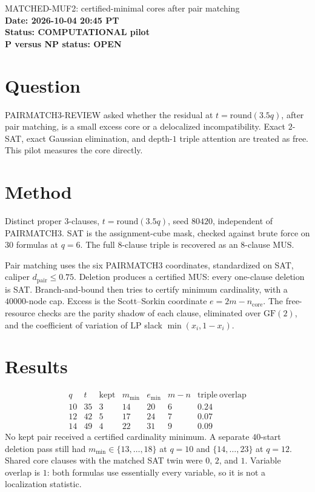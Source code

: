 \documentclass[11pt]{article}
\begin{document}
\begin{center}
{\Large MATCHED-MUF2: certified-minimal cores after pair matching}\\[4pt]
\textbf{Date: 2026-10-04 20:45 PT}\\
\textbf{Status: COMPUTATIONAL pilot}\\
\textbf{P versus NP status: OPEN}
\end{center}

\section{Question}
PAIRMATCH3-REVIEW asked whether the residual at \(t=\mathrm{round}(3.5q)\), after pair matching, is a small excess core or a delocalized incompatibility. Exact \(2\)-SAT, exact Gaussian elimination, and depth-\(1\) triple attention are treated as free. This pilot measures the core directly.

\section{Method}
Distinct proper \(3\)-clauses, \(t=\mathrm{round}(3.5q)\), seed \(80420\), independent of PAIRMATCH3. SAT is the assignment-cube mask, checked against brute force on \(30\) formulas at \(q=6\). The full \(8\)-clause triple is recovered as an \(8\)-clause MUS.

Pair matching uses the six PAIRMATCH3 coordinates, standardized on SAT, caliper \(d_{\mathrm{pair}}\le 0.75\). Deletion produces a certified MUS: every one-clause deletion is SAT. Branch-and-bound then tries to certify minimum cardinality, with a \(40000\)-node cap. Excess is the Scott--Sorkin coordinate \(e=2m-n_{\mathrm{core}}\). The free-resource checks are the parity shadow of each clause, eliminated over \(\mathrm{GF}(2)\), and the coefficient of variation of LP slack \(\min(x_i,1-x_i)\).

\section{Results}
\[
\begin{array}{c|c|c|c|c|c|c}
q&t&\mathrm{kept}&m_{\min}&e_{\min}&m-n&\mathrm{triple\ overlap}\\
\hline
10&35&3&14&20&6&0.24\\
12&42&5&17&24&7&0.07\\
14&49&4&22&31&9&0.09
\end{array}
\]
No kept pair received a certified cardinality minimum. A separate \(40\)-start deletion pass still had \(m_{\min}\in\{13,\ldots,18\}\) at \(q=10\) and \(\{14,\ldots,23\}\) at \(q=12\). Shared core clauses with the matched SAT twin were \(0\), \(2\), and \(1\). Variable overlap is \(1\): both formulas use essentially every variable, so it is not a localization statistic.
\end{document}
